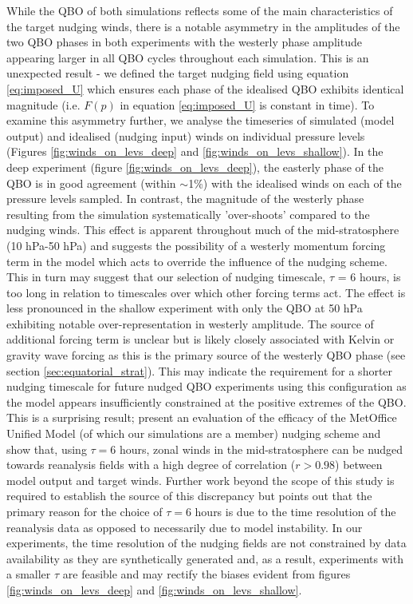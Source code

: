 While the QBO of both simulations reflects some of the main characteristics of the target nudging winds, there is a notable asymmetry in the amplitudes of the two QBO phases in both experiments with the westerly phase amplitude appearing larger in all QBO cycles throughout each simulation. This is an unexpected result - we defined the target nudging field using equation \ref{eq:imposed_U} which ensures each phase of the idealised QBO exhibits identical magnitude (i.e. $F(p)$ in equation \ref{eq:imposed_U} is constant in time). To examine this asymmetry further, we analyse the timeseries of simulated (model output) and idealised (nudging input) winds on individual pressure levels (Figures \ref{fig:winds_on_levs_deep} and \ref{fig:winds_on_levs_shallow}). In the deep experiment (figure \ref{fig:winds_on_levs_deep}), the easterly phase of the QBO is in good agreement (within $\sim$1\%) with the idealised winds on each of the pressure levels sampled. In contrast, the magnitude of the westerly phase resulting from the simulation systematically 'over-shoots' compared to the nudging winds. This effect is apparent throughout much of the mid-stratosphere (10 hPa-50 hPa) and suggests the possibility of a westerly momentum forcing term in the model which acts to override the influence of the nudging scheme. This in turn may suggest that our selection of nudging timescale, $\tau$ = 6 hours, is too long in relation to timescales over which other forcing terms act. The effect is less pronounced in the shallow experiment with only the QBO at 50 hPa exhibiting notable over-representation in westerly amplitude. The source of additional forcing term is unclear but is likely closely associated with Kelvin or gravity wave forcing as this is the primary source of the westerly QBO phase (see section \ref{sec:equatorial_strat}). This may indicate the requirement for a shorter nudging timescale for future nudged QBO experiments using this configuration as the model appears insufficiently constrained at the positive extremes of the QBO. This is a surprising result; \cite{telfordTechnical2008} present an evaluation of the efficacy of the MetOffice Unified Model (of which our simulations are a member) nudging scheme and show that, using $\tau = 6$ hours, zonal winds in the mid-stratosphere can be nudged towards reanalysis fields with a high degree of correlation ($r>0.98$) between model output and target winds. Further work beyond the scope of this study is required to establish the source of this discrepancy but \cite{telfordTechnical2008} points out that the primary reason for the choice of $\tau = 6$ hours is due to the time resolution of the reanalysis data as opposed to necessarily due to model instability. In our experiments, the time resolution of the nudging fields are not constrained by data availability as they are synthetically generated and, as a result, experiments with a smaller $\tau$ are feasible and may rectify the biases evident from figures \ref{fig:winds_on_levs_deep} and \ref{fig:winds_on_levs_shallow}.

